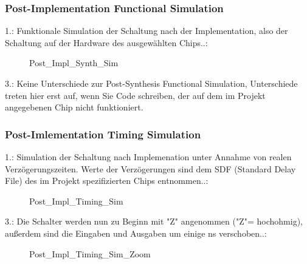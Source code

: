\documentclass{article}
\begin{document}
\subsubsection{Post-Implementation Functional Simulation}
1.:\newline
Funktionale Simulation der Schaltung nach der Implementation, also der Schaltung auf der Hardware des ausgew\"ahlten Chips..:\newline
\begin{figure}[H]
\begin{center}
\caption{Post\_Impl\_Synth\_Sim}
\end{center}
\end{figure}
3.:\newline
Keine Unterschiede zur Post-Synthesis Functional Simulation, Unterschiede treten hier erst auf, wenn Sie Code schreiben, der auf dem im Projekt angegebenen Chip nicht funktioniert.

\subsubsection{Post-Imlementation Timing Simulation}
1.:\newline
Simulation der Schaltung nach Implemenation unter Annahme von realen Verz\"ogerungszeiten. Werte der Verz\"ogerungen sind dem SDF (Standard Delay File) des im Projekt spezifizierten Chips entnommen.\citep{SDF}.:\newline
\begin{figure}[H]
\begin{center}
\caption{Post\_Impl\_Timing\_Sim}
\end{center}
\end{figure}
3.:\newline
Die Schalter werden nun zu Beginn mit "Z" angenommen ("Z"= hochohmig), au{\ss}erdem sind die Eingaben und Ausgaben um einige ns verschoben..:\newline
\begin{figure}[H]
\begin{center}
\caption{Post\_Impl\_Timing\_Sim\_Zoom}
\end{center}
\end{figure}
\end{document}

